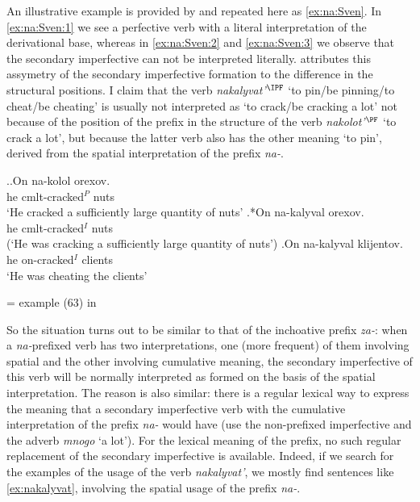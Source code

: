 An illustrative example is provided by \citet[233]{Svenonius:04b} and repeated here as \ref{ex:na:Sven}. In \ref{ex:na:Sven:1} we see a perfective verb with a literal interpretation of the derivational base, whereas in \ref{ex:na:Sven:2} and \ref{ex:na:Sven:3} we observe that the secondary imperfective can not be interpreted literally. \citet[233]{Svenonius:04b} attributes this assymetry of the secondary imperfective formation to the difference in the structural positions. I claim that the verb \textit{nakalyvat'$^{\IPF}$} `to pin/be pinning/to cheat/be cheating' is usually not interpreted as `to crack/be cracking a lot' not because of the position of the prefix in the structure of the verb \textit{nakolot'$^{\PF}$} `to crack a lot', but because the latter verb also has the other meaning `to pin', derived from the spatial interpretation of the prefix \textit{na-}. 

\ex.\label{ex:na:Sven}\ag.\label{ex:na:Sven:1}On na-kolol orexov.\\
he cmlt-cracked$^P$ nuts\\
\vspace{0.5em}
`He cracked a sufficiently large quantity of nuts'
\bg.\label{ex:na:Sven:2}*On na-kalyval orexov.\\
he cmlt-cracked$^I$ nuts\\
\vspace{0.5em}
(`He was cracking a sufficiently large quantity of nuts')
\bg.\label{ex:na:Sven:3}On na-kalyval klijentov.\\
he on-cracked$^I$ clients\\
\vspace{0.5em}
`He was cheating the clients' 
\begin{flushright}
\vspace{-0.5em}
= example (63) in \citealt[230]{Svenonius:04b}
\end{flushright}

So the situation turns out to be similar to that of the inchoative prefix \textit{za-}: when a \textit{na-}prefixed verb has two interpretations, one (more frequent) of them involving spatial and the other involving cumulative meaning, the secondary imperfective of this verb will be normally interpreted as formed on the basis of the spatial interpretation. The reason is also similar: there is a regular lexical way to express the meaning that a secondary imperfective verb with the cumulative interpretation of the prefix \textit{na-} would have (use the non-prefixed imperfective and the adverb \textit{mnogo} `a lot'). For the lexical meaning of the prefix, no such regular replacement of the secondary imperfective is available. Indeed, if we search for the examples of the usage of the verb \textit{nakalyvat'}, we mostly find sentences like \ref{ex:nakalyvat}, involving the spatial usage of the prefix \textit{na-}. 

